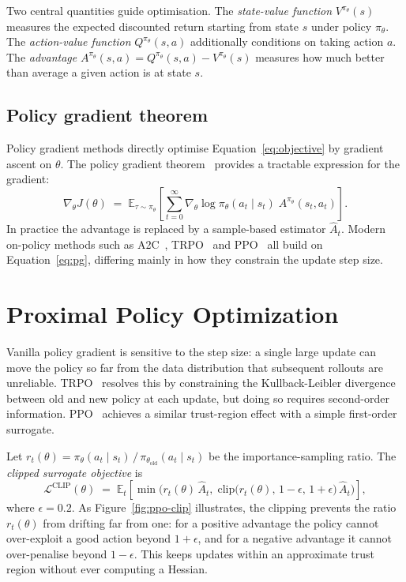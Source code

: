 Two central quantities guide optimisation. The \emph{state-value function} \(V^{\pi_\theta}(s)\)
measures the expected discounted return starting from state \(s\) under policy \(\pi_\theta\).
The \emph{action-value function} \(Q^{\pi_\theta}(s,a)\) additionally conditions on taking
action \(a\). The \emph{advantage} \(A^{\pi_\theta}(s,a) = Q^{\pi_\theta}(s,a) - V^{\pi_\theta}(s)\)
measures how much better than average a given action is at state \(s\).

\subsection{Policy gradient theorem}\label{sec:sota-pg}

Policy gradient methods directly optimise Equation~\eqref{eq:objective} by gradient ascent on
\(\theta\). The policy gradient theorem~\cite{sutton1999policygradient} provides a tractable
expression for the gradient:
\begin{equation}
  \nabla_\theta J(\theta) \;=\; \mathbb{E}_{\tau \sim \pi_\theta}\!\left[
     \sum_{t=0}^{\infty} \nabla_\theta \log \pi_\theta(a_t \mid s_t)\; A^{\pi_\theta}(s_t, a_t)
  \right].
  \label{eq:pg}
\end{equation}
In practice the advantage is replaced by a sample-based estimator \(\hat{A}_t\). Modern on-policy
methods such as A2C~\cite{mnih2016asynchronous}, TRPO~\cite{schulman2015trpo} and PPO~\cite{schulman2017ppo} all build on
Equation~\eqref{eq:pg}, differing mainly in how they constrain the update step size.

\section{Proximal Policy Optimization}\label{sec:sota-ppo}

Vanilla policy gradient is sensitive to the step size: a single large update can move the policy
so far from the data distribution that subsequent rollouts are unreliable. TRPO~\cite{schulman2015trpo}
resolves this by constraining the Kullback-Leibler divergence between old and new policy at each
update, but doing so requires second-order information. PPO~\cite{schulman2017ppo} achieves a
similar trust-region effect with a simple first-order surrogate.

Let \(r_t(\theta) = \pi_\theta(a_t \mid s_t)\,/\,\pi_{\theta_{\text{old}}}(a_t \mid s_t)\)
be the importance-sampling ratio. The \emph{clipped surrogate objective} is
\begin{equation}
  \mathcal{L}^{\mathrm{CLIP}}(\theta)
   \;=\; \mathbb{E}_t\!\left[
     \min\!\Big(
        r_t(\theta)\,\hat{A}_t,\;
        \mathrm{clip}\!\big(r_t(\theta),\, 1-\epsilon,\, 1+\epsilon\big)\,\hat{A}_t
     \Big)
   \right],
  \label{eq:ppo-clip}
\end{equation}
where \(\epsilon = 0.2\). As Figure~\ref{fig:ppo-clip} illustrates, the clipping prevents the
ratio \(r_t(\theta)\) from drifting far from one: for a positive advantage the policy cannot
over-exploit a good action beyond \(1+\epsilon\), and for a negative advantage it cannot
over-penalise beyond \(1-\epsilon\). This keeps updates within an approximate trust region
without ever computing a Hessian.

